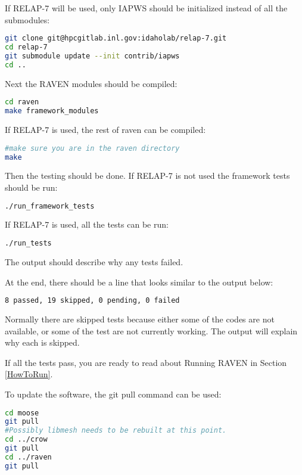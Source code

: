 If RELAP-7 will be used, only IAPWS should be initialized instead of
all the submodules:

\begin{lstlisting}[language=bash]
git clone git@hpcgitlab.inl.gov:idaholab/relap-7.git
cd relap-7
git submodule update --init contrib/iapws
cd ..
\end{lstlisting}

Next the RAVEN modules should be compiled:

\begin{lstlisting}[language=bash]
cd raven
make framework_modules
\end{lstlisting}

If RELAP-7 is used, the rest of raven can be compiled:

\begin{lstlisting}[language=bash]
#make sure you are in the raven directory
make
\end{lstlisting}


Then the testing should be done.  If RELAP-7 is not used the framework
tests should be run:

\begin{lstlisting}[language=bash]
./run_framework_tests
\end{lstlisting}

If RELAP-7 is used, all the tests can be run:

\begin{lstlisting}[language=bash]
./run_tests
\end{lstlisting}


The output should describe why any tests failed.

At the end, there should be a line that looks similar to the output below:
\begin{lstlisting}[language=bash]
8 passed, 19 skipped, 0 pending, 0 failed
\end{lstlisting}

Normally there are skipped tests because either some of the codes are
not available, or some of the test are not currently working.  The
output will explain why each is skipped.

If all the tests pass, you are ready to read about Running RAVEN in
Section \ref{HowToRun}.

To update the software, the git pull command can be used:

\begin{lstlisting}[language=bash]
cd moose
git pull
#Possibly libmesh needs to be rebuilt at this point.
cd ../crow
git pull
cd ../raven
git pull
\end{lstlisting}


